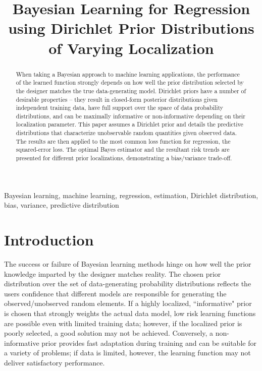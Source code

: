 \documentclass{article}
\title{Bayesian Learning for Regression using Dirichlet Prior Distributions of Varying Localization}
\begin{document}
\maketitle


\begin{abstract}
When taking a Bayesian approach to machine learning applications, the performance of the learned function strongly depends on how well the prior distribution selected by the designer matches the true data-generating model. Dirichlet priors have a number of desirable properties -- they result in closed-form posterior distributions given independent training data, have full support over the space of data probability distributions, and can be maximally informative or non-informative depending on their localization parameter. This paper assumes a Dirichlet prior and details the predictive distributions that characterize unobservable random quantities given observed data. The results are then applied to the most common loss function for regression, the squared-error loss. The optimal Bayes estimator and the resultant risk trends are presented for different prior localizations, demonstrating a bias/variance trade-off. 
\end{abstract}

\begin{keywords}
Bayesian learning, machine learning, regression, estimation, Dirichlet distribution, bias, variance, predictive distribution
\end{keywords}


\section{Introduction}

The success or failure of Bayesian learning methods hinge on how well the prior knowledge imparted by the designer matches reality. The chosen prior distribution over the set of data-generating probability distributions reflects the users confidence that different models are responsible for generating the observed/unobserved random elements. If a highly localized, ``informative" prior is chosen that strongly weights the actual data model, low risk learning functions are possible even with limited training data; however, if the localized prior is poorly selected, a good solution may not be achieved. Conversely, a non-informative prior provides fast adaptation during training and can be suitable for a variety of problems; if data is limited, however, the learning function may not deliver satisfactory performance.
\end{document}
